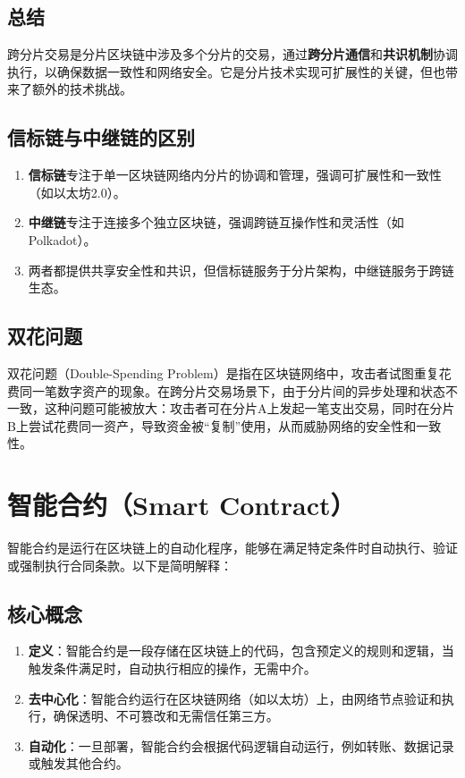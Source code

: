 \documentclass[12pt]{ctexart}
\begin{document}
\subsection{总结}
跨分片交易是分片区块链中涉及多个分片的交易，通过\textbf{跨分片通信}和\textbf{共识机制}协调执行，以确保数据一致性和网络安全。它是分片技术实现可扩展性的关键，但也带来了额外的技术挑战。

\subsection{信标链与中继链的区别}
\begin{enumerate}
    \item \textbf{信标链}专注于单一区块链网络内分片的协调和管理，强调可扩展性和一致性（如以太坊2.0）。
    \item \textbf{中继链}专注于连接多个独立区块链，强调跨链互操作性和灵活性（如Polkadot）。
    \item 两者都提供共享安全性和共识，但信标链服务于分片架构，中继链服务于跨链生态。
\end{enumerate}

\subsection{双花问题}
双花问题（Double-Spending Problem）是指在区块链网络中，攻击者试图重复花费同一笔数字资产的现象。在跨分片交易场景下，由于分片间的异步处理和状态不一致，这种问题可能被放大：攻击者可在分片A上发起一笔支出交易，同时在分片B上尝试花费同一资产，导致资金被“复制”使用，从而威胁网络的安全性和一致性。

\newpage
\section{智能合约（Smart Contract）}
智能合约是运行在区块链上的自动化程序，能够在满足特定条件时自动执行、验证或强制执行合同条款。以下是简明解释：

\subsection{核心概念}
\begin{enumerate}
    \item \textbf{定义}：智能合约是一段存储在区块链上的代码，包含预定义的规则和逻辑，当触发条件满足时，自动执行相应的操作，无需中介。
    \item \textbf{去中心化}：智能合约运行在区块链网络（如以太坊）上，由网络节点验证和执行，确保透明、不可篡改和无需信任第三方。
    \item \textbf{自动化}：一旦部署，智能合约会根据代码逻辑自动运行，例如转账、数据记录或触发其他合约。
\end{enumerate}
\end{document}
